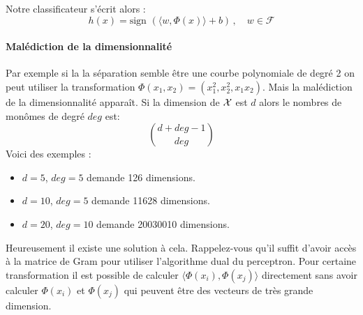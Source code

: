 \begin{center}
\end{center}

Notre classificateur s'écrit alors :
$$ h(x) = \text{sign } \left( \langle w, \Phi(x) \rangle + b \right) \, , \quad w \in \mathcal{F} $$

\paragraph{Malédiction de la dimensionnalité}
Par exemple si la la séparation semble être une courbe polynomiale de degré 2 on peut utiliser la transformation $\Phi(x_1, x_2) = (x_1^2, x_2^2, x_1 x_2)$. Mais la malédiction de la dimensionnalité apparaît. Si la dimension de $\mathcal{X}$ est $d$ alors le nombres de monômes de degré $deg$ est:
$$ \binom{d + deg - 1}{deg} $$
Voici des exemples :
\begin{itemize}
	\item $d = 5$, $deg = 5$ demande 126 dimensions.
	\item $d = 10$, $deg = 5$ demande 11628 dimensions.
	\item $d = 20$, $deg = 10$ demande 20030010 dimensions.
\end{itemize}
Heureusement il existe une solution à cela. Rappelez-vous qu'il suffit d'avoir accès à la matrice de Gram pour utiliser l'algorithme dual du perceptron. Pour certaine transformation il est possible de calculer $\langle \Phi(x_i), \Phi(x_j) \rangle$ directement sans avoir calculer $\Phi(x_i)$ et $\Phi(x_j)$ qui peuvent être des vecteurs de très grande dimension.

